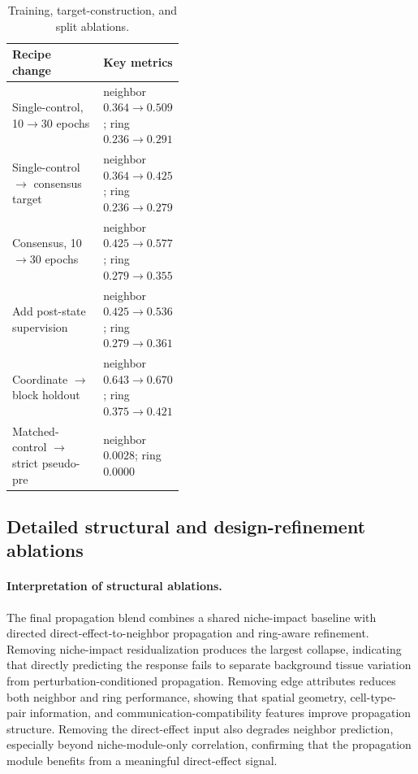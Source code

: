 \documentclass[sigconf,review,balance=false]{acmart}
\begin{document}
\begin{table}[t]
\centering
\caption{Training, target-construction, and split ablations.}
\label{tab:app_ablation_recipe}
\footnotesize
\setlength{\tabcolsep}{4pt}
\renewcommand{\arraystretch}{1.14}
\begin{tabularx}{\linewidth}{@{}>{\raggedright\arraybackslash}X>{\raggedright\arraybackslash}p{0.42\linewidth}@{}}
\toprule
Recipe change & Key metrics \\
\midrule
Single-control, 10$\rightarrow$30 epochs & neighbor $0.364\rightarrow0.509$; ring $0.236\rightarrow0.291$ \\
Single-control $\rightarrow$ consensus target & neighbor $0.364\rightarrow0.425$; ring $0.236\rightarrow0.279$ \\
Consensus, 10$\rightarrow$30 epochs & neighbor $0.425\rightarrow0.577$; ring $0.279\rightarrow0.355$ \\
Add post-state supervision & neighbor $0.425\rightarrow0.536$; ring $0.279\rightarrow0.361$ \\
Coordinate $\rightarrow$ block holdout & neighbor $0.643\rightarrow0.670$; ring $0.375\rightarrow0.421$ \\
Matched-control $\rightarrow$ strict pseudo-pre & neighbor $0.0028$; ring $0.0000$ \\
\bottomrule
\end{tabularx}
\end{table}

\subsection{Detailed structural and design-refinement ablations}
\label{app:structural_design_refinement}

\paragraph{Interpretation of structural ablations.}
The final propagation blend combines a shared niche-impact baseline with directed direct-effect-to-neighbor propagation and ring-aware refinement. Removing niche-impact residualization produces the largest collapse, indicating that directly predicting the response fails to separate background tissue variation from perturbation-conditioned propagation. Removing edge attributes reduces both neighbor and ring performance, showing that spatial geometry, cell-type-pair information, and communication-compatibility features improve propagation structure. Removing the direct-effect input also degrades neighbor prediction, especially beyond niche-module-only correlation, confirming that the propagation module benefits from a meaningful direct-effect signal.
\end{document}

